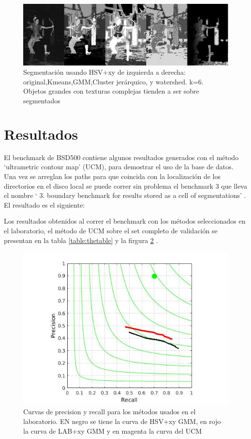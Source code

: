 \documentclass[10pt,twocolumn,letterpaper]{article}
\begin{document}
\begin{figure}
\begin{center}
\includegraphics[width=0.95\linewidth]
                {img/woman.jpg}
\end{center}
\caption{Segmentación usando HSV+xy de izquierda a derecha: original,Kmeans,GMM,Cluster jerárquico, y watershed. k=6. Objetos grandes con texturas complejas tienden a ser sobre segmentados}
\label{fig:woman}
\end{figure}


\section{Resultados}

El benchmark de BSD500 contiene algunos resultados generados con el método ‘ultrametric contour map’ (UCM), para demostrar el uso de la base de datos. Una vez se arreglan los paths para que coincida con la localización de los directorios en el disco local se puede correr sin problema el benchmark 3 que lleva el nombre ‘ 3. boundary benchmark for results stored as a cell of segmentations’ . El resultado es el siguiente:




Los resultados obtenidos al correr el benchmark con los métodos seleccionados en el laboratorio, el método de UCM sobre el set completo de validación se presentan en la tabla \ref{table:thetable} y la firgura \ref{fig:plot} .


\begin{figure}
\begin{center}
\includegraphics[width=1.15\linewidth]
                {img/metods.jpg}
\end{center}
\caption{Curvas de precision y recall para los métodos usados en el laboratorio. EN negro se tiene la curva de HSV+xy GMM, en rojo la curva de LAB+xy GMM y en magenta la curva del UCM}
\label{fig:plot}
\end{figure}
\end{document}
